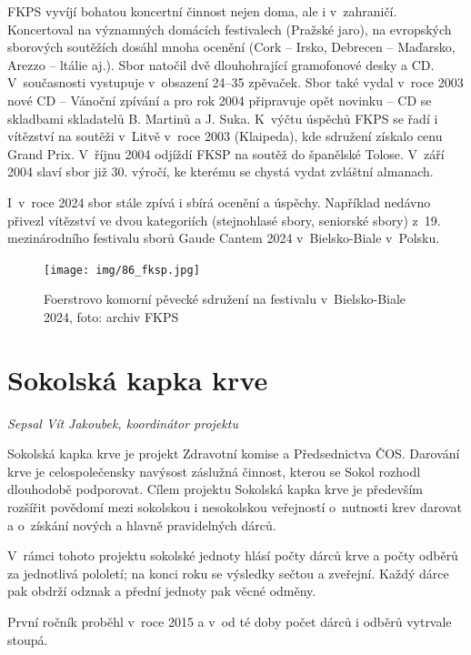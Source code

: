 \documentclass[a5paper, 11pt, twoside]{article}
\begin{document}
FKPS vyvíjí bohatou koncertní činnost nejen doma, ale i v~zahraničí.
Koncertoval na významných domácích festivalech (Pražské jaro), na
evropských sborových soutěžích dosáhl mnoha ocenění (Cork -- Irsko,
Debrecen -- Maďarsko, Arezzo -- ltálie aj.). Sbor natočil dvě
dlouhohrající gramofonové desky a CD. V~současnosti vystupuje v~obsazení
24--35 zpěvaček. Sbor také vydal v~roce 2003 nové CD -- Vánoční zpívání
a pro rok 2004 připravuje opět novinku -- CD se skladbami skladatelů B.
Martinů a J. Suka. K~výčtu úspěchů FKPS se řadí i vítězství na soutěži
v~Litvě v~roce 2003 (Klaipeda), kde sdružení získalo cenu Grand Prix.
V~říjnu 2004 odjíždí FKSP na soutěž do španělské Tolose. V~září 2004 slaví
sbor již 30. výročí, ke kterému se chystá vydat zvláštní almanach.

I~v~roce 2024 sbor stále zpívá i sbírá ocenění a úspěchy. Například
nedávno přivezl vítězství ve dvou kategoriích (stejnohlasé sbory,
seniorské sbory) z~19. mezinárodního festivalu sborů Gaude Cantem 2024
v~Bielsko-Biale v~Polsku.

\begin{figure}[h]
  \centering 
  \texttt{[image: img/86\_fksp.jpg]}
  \caption*{Foerstrovo komorní pěvecké sdružení na festivalu v~Bielsko-Biale
  2024, foto: archiv FKPS}
\end{figure}

\section{Sokolská kapka krve}

\begin{center}
  \textit{Sepsal Vít Jakoubek, koordinátor projektu}
\end{center}

\noindent
Sokolská kapka krve je projekt Zdravotní komise a Předsednictva ČOS.
Darování krve je celospolečensky navýsost záslužná činnost, kterou se
Sokol rozhodl dlouhodobě podporovat. Cílem projektu Sokolská kapka krve
je především rozšířit povědomí mezi sokolskou i nesokolskou veřejností
o~nutnosti krev darovat a o~získání nových a hlavně pravidelných dárců.

V~rámci tohoto projektu sokolské jednoty hlásí počty dárců krve a počty
odběrů za jednotlivá pololetí; na konci roku se výsledky sečtou a
zveřejní. Každý dárce pak obdrží odznak a přední jednoty pak věcné
odměny.

První ročník proběhl v~roce 2015 a v~od té doby počet dárců i odběrů
vytrvale stoupá.
\end{document}
